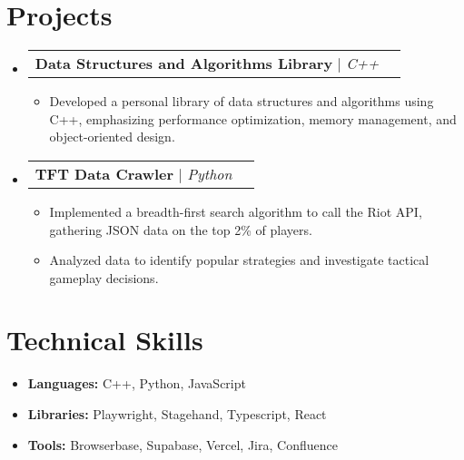 \documentclass[letterpaper,11pt]{article}
\makeatletter
\newcommand{\resumeItem}[1]{
  \item\small{
    {#1 \vspace{-2pt}}
  }
}
\newcommand{\resumeProjectHeading}[2]{
    \item
    \begin{tabular*}{1.0\textwidth}{l@{\extracolsep{\fill}}r}
      \small #1 & \textbf{\small #2} \\
    \end{tabular*}\vspace{-7pt}
}
\newcommand{\resumeSubHeadingListStart}{\begin{itemize}[leftmargin=0in, label={}]}
\newcommand{\resumeSubHeadingListEnd}{\end{itemize}}
\newcommand{\resumeItemListStart}{\begin{itemize}}
\newcommand{\resumeItemListEnd}{\end{itemize}\vspace{-5pt}}
\makeatother
\begin{document}

\section{Projects}
\resumeSubHeadingListStart

    \resumeProjectHeading
      {\textbf{Data Structures and Algorithms Library} $|$ \emph{C++}}{}
      \resumeItemListStart
          \resumeItem{Developed a personal library of data structures and algorithms using C++, emphasizing performance optimization, memory management, and object-oriented design.}
      \resumeItemListEnd

    \resumeProjectHeading
      {\textbf{TFT Data Crawler} $|$ \emph{Python}}{}
      \resumeItemListStart
          \resumeItem{Implemented a breadth-first search algorithm to call the Riot API, gathering JSON data on the top 2\% of players.}
          \resumeItem{Analyzed data to identify popular strategies and investigate tactical gameplay decisions.}
      \resumeItemListEnd

\resumeSubHeadingListEnd

\section{Technical Skills}
\resumeSubHeadingListStart
    \resumeItem{ \textbf{Languages:} C++, Python, JavaScript }
    \resumeItem{ \textbf{Libraries:} Playwright, Stagehand, Typescript, React }
    \resumeItem{ \textbf{Tools:} Browserbase, Supabase, Vercel, Jira, Confluence }
\resumeSubHeadingListEnd
\end{document}
